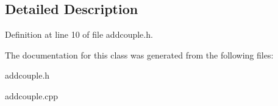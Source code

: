 \subsection{Detailed Description}


Definition at line 10 of file addcouple.\+h.



The documentation for this class was generated from the following files\+:\begin{DoxyCompactItemize}
\item 
addcouple.\+h\item 
addcouple.\+cpp\end{DoxyCompactItemize}
